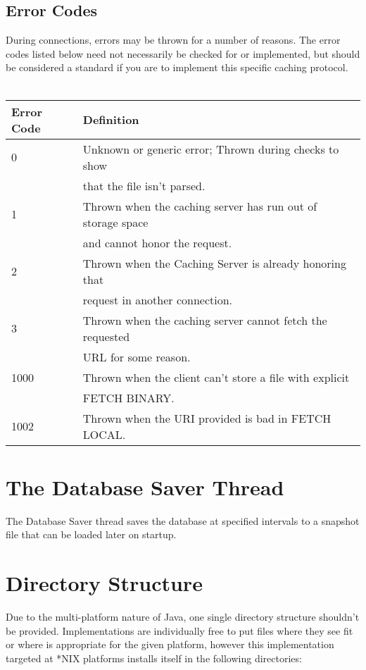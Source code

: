 \documentclass[letterpaper]{article}
\begin{document}
\subsection{Error Codes}
During connections, errors may be thrown for a number of reasons. The error codes listed below need not necessarily be checked for or implemented, but should be considered a standard if you are to implement this specific caching protocol.
\\
\\
\begin{tabular}{|l|l|}
\hline
\textbf{Error Code} & \textbf{Definition}\\
\hline
\hline
0 & Unknown or generic error; Thrown during checks to show \\
  & that the file isn't parsed.\\
\hline
1 & Thrown when the caching server has run out of storage space \\
  & and cannot honor the request.\\
\hline
2 & Thrown when the Caching Server is already honoring that \\
  & request in another connection.\\
\hline
3 & Thrown when the caching server cannot fetch the requested \\
  & URL for some reason.\\
\hline
1000 & Thrown when the client can't store a file with explicit\\
     & FETCH BINARY.\\
\hline
1002 & Thrown when the URI provided is bad in FETCH LOCAL.\\
\hline
\end{tabular}

\section{The Database Saver Thread}
The Database Saver thread saves the database at specified intervals to a snapshot file that can be loaded later on startup. 

\section{Directory Structure}
Due to the multi-platform nature of Java, one single directory structure shouldn't be provided. Implementations are individually free to put files where they see fit or where is appropriate for the given platform, however this implementation targeted at *NIX platforms installs itself in the following directories:
\end{document}
